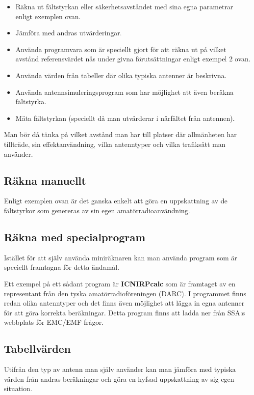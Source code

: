 \begin{itemize}
	\item Räkna ut fältstyrkan eller säkerhetsavståndet med sina egna
	parametrar enligt exemplen ovan.
	\item Jämföra med andras utvärderingar.
	\item Använda programvara som är speciellt gjort för att räkna ut på
	vilket avstånd referensvärdet nås under givna förutsättningar enligt
	exempel 2 ovan.
	\item Använda värden från tabeller där olika typiska antenner är beskrivna.
	\item Använda antennsimuleringsprogram som har möjlighet att även
	beräkna fältstyrka.
	\item Mäta fältstyrkan (speciellt då man utvärderar i närfältet från
	antennen).
\end{itemize}

Man bör då tänka på vilket avstånd man har till platser där allmänheten har
tillträde, sin effektanvändning, vilka antenntyper och vilka trafiksätt man
använder.

\subsection{Räkna manuellt}

Enligt exemplen ovan är det ganska enkelt att göra en uppskattning av
de fältstyrkor som genereras av sin egen amatörradioanvändning.

\subsection{Räkna med specialprogram}

Istället för att själv använda miniräknaren kan man använda program
som är speciellt framtagna för detta ändamål.

Ett exempel på ett sådant program är \textbf{ICNIRPcalc} som är framtaget av en
representant från den tyska amatörradioföreningen (DARC).
I programmet finns redan olika antenntyper och det finns även möjlighet att
lägga in egna antenner för att göra korrekta beräkningar.
Detta program finns att ladda ner från SSA:s webbplats för EMC/EMF-frågor.

\subsection{Tabellvärden}
Utifrån den typ av antenn man själv använder kan man jämföra med
typiska värden från andras beräkningar och göra en hyfsad uppskattning
av sig egen situation.

